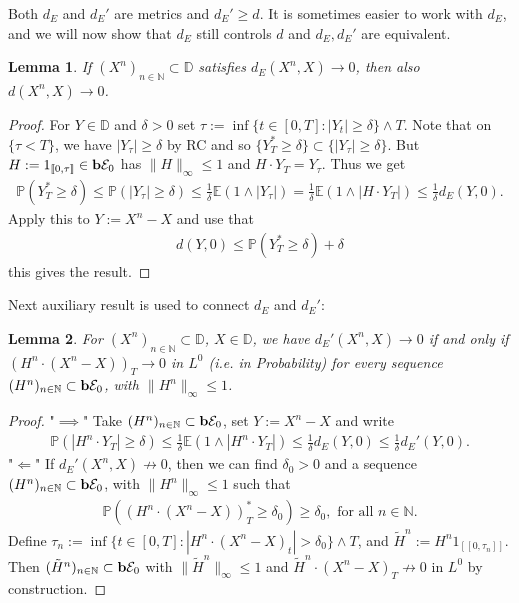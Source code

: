 \documentclass[12pt,a4paper, twoside]{article}
\newtheorem{lem}{Lemma}[section]
\theoremstyle{definition}
\newcommand{\EE}{\mathbb{E}} %
\newcommand{\PP}{\mathbb{P}} %
\newcommand{\simple}{\textbf{\text{b}}\mathcal{E}}
\begin{document}
Both $d_E$ and $d_E' $ are metrics and $d_E' \geq d$. It is sometimes easier to work with $d_E$, and we will now show that $d_E$ still controls $d$ and $d_E, d_E'$ are equivalent. 
\newpage
\begin{lem} \label{L31} If $(X^n)_{n \in \mathbb{N}} \subset \mathbb{D}$ satisfies $d_E(X^n, X) \to 0$, then also $d(X^n, X) \to 0$. 
\end{lem}
\begin{proof}
For $Y \in \mathbb{D}$ and $\delta >0$ set $\tau := \inf \{ t \in [0,T]: |Y_t| \geq \delta \} \wedge T$. Note that on $\{ \tau < T\}$, we have $|Y_\tau| \geq \delta$ by RC and so $\{ Y_T^* \geq \delta \} \subset \{ | Y_\tau| \geq \delta\}$. But $H:= 1_{[\![ 0 ,\tau ]\!]} \in \simple_0$ has $\|H\|_\infty \leq 1$ and $H \cdot Y_T = Y_\tau$. Thus we get 
\begin{align*}
\PP( Y_T^* \geq \delta) \leq \PP( |Y_\tau| \geq \delta) \leq \frac{1}{\delta} \EE( 1 \wedge | Y_\tau|)  = \frac{1}{\delta} \EE(1 \wedge | H \cdot Y_T|) \leq \frac{1}{\delta} d_E(Y,0).
\end{align*}
Apply this to $Y:= X^n-X$ and use that 
\begin{align*}
d(Y,0) \leq \PP( Y_T^* \geq \delta) + \delta
\end{align*}
this gives the result. 
\end{proof}
Next auxiliary result is used to connect $d_E$ and $d_E'$: 
\begin{lem}\label{L32} For $(X^n)_{n \in \mathbb{N}} \subset \mathbb{D}$, $X \in \mathbb{D}$, we have $d_E' (X^n, X) \to 0$ if and only if $(H^n \cdot (X^n-X))_T \to 0$ in $L^0$ (i.e. in Probability) for every sequence $(H^n)_{n \in \mathbb{N}} \subset \simple_0$, with $\|H^n \|_\infty \leq 1$. 
\end{lem}
\begin{proof}
"$\implies$" Take $(H^n)_{n \in \mathbb{N}} \subset \simple_0$, set $Y:= X^n-X$ and write 
\begin{align*}
\PP(|H^n \cdot Y_T| \geq \delta) \leq \frac{1}{\delta} \EE(1 \wedge |H^n \cdot Y_T|) \leq \frac{1}{\delta}d_E(Y,0) \leq \frac{1}{\delta}d_E' (Y,0). 
\end{align*}
"$\Longleftarrow$" If $d_E' (X^n,X) \not\to 0$, then we can find $\delta_0>0$ and a sequence $(H^n)_{n \in \mathbb{N}} \subset \simple_0$, with $\|H^n\|_\infty \leq 1$ such that 
\begin{align*}
\PP((H^n \cdot (X^n-X))_T^* \geq \delta_0) \geq \delta_0, \text{ for all } n \in \mathbb{N}.
\end{align*}
Define $\tau_n:= \inf \{ t \in [0,T] : |H^n \cdot (X^n-X)_t| > \delta_0 \} \wedge T$, and $\tilde{H}^n := H^n 1_{ [\![ 0, \tau_n ]\!]}$.  Then $(\tilde{H}^n)_{n \in \mathbb{N}} \subset \simple_0$ with $\| \tilde{H}^n \|_\infty \leq 1$ and $\tilde{H}^n  \cdot (X^n-X)_T \not \to 0$ in $L^0$ by construction.  
\end{proof}
\end{document}
